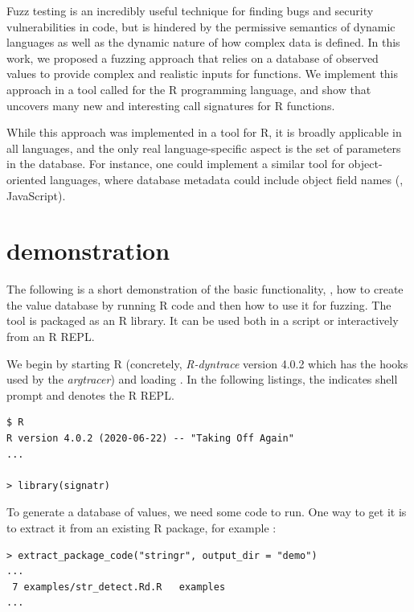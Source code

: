 \documentclass[sigplan,nonacm,anonymous,review]{acmart}
\begin{document}
Fuzz testing is an incredibly useful technique for finding bugs and security vulnerabilities in code, but is hindered by the permissive semantics of dynamic languages as well as the dynamic nature of how complex data is defined.
In this work, we proposed a fuzzing approach that relies on a database of observed values to provide complex and realistic inputs for functions.
We implement this approach in a tool called \tool for the R programming language, and show that \tool uncovers many new and interesting call signatures for R functions.

While this approach was implemented in a tool for R, it is broadly applicable in all languages, and the only real language-specific aspect is the set of parameters in the database.
For instance, one could implement a similar tool for object-oriented languages, where database metadata could include object field names (\Eg, JavaScript).




\appendix

\section{\tool demonstration}\label{sec:demo}

\lstset{
    basicstyle=\scriptsize\ttfamily,
    numbers=none,
}

The following is a short demonstration of the basic \tool functionality, \Ie, how to create the value database by running R code and then how to use it for fuzzing.
The tool is packaged as an R library.
It can be used both in a script or interactively from an R REPL.

We begin by starting R (concretely, \emph{R-dyntrace} version 4.0.2 which has the hooks used by the \emph{argtracer}) and loading \tool.
In the following listings, the \code{\$} indicates shell prompt and \code{>} denotes the R REPL.

\begin{lstlisting}
$ R
R version 4.0.2 (2020-06-22) -- "Taking Off Again"
...

> library(signatr)
\end{lstlisting}

To generate a database of values, we need some code to run.
One way to get it is to extract it from an existing R package, for example :

\begin{lstlisting}
> extract_package_code("stringr", output_dir = "demo")
...
 7 examples/str_detect.Rd.R   examples
...
\end{lstlisting}
\end{document}

